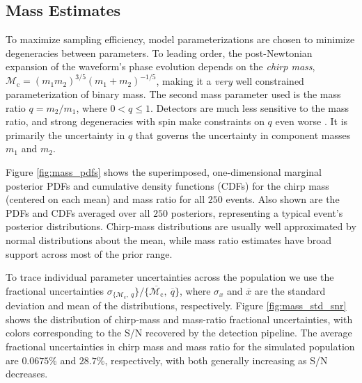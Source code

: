 \subsection{Mass Estimates}\label{sec:mass}
To maximize sampling efficiency, model parameterizations are chosen to minimize degeneracies between parameters.  To leading order, the post-Newtonian expansion of the waveform's phase evolution depends on the \emph{chirp mass}, $\mathcal{M}_\mathrm{c} = (m_1 m_2)^{3/5} (m_1 + m_2)^{-1/5}$, making it a \emph{very} well constrained parameterization of binary mass.  The second mass parameter used is the mass ratio $q = m_2/m_1$, where $0 < q \leq 1$.  Detectors are much less sensitive to the mass ratio, and strong degeneracies with spin make constraints on $q$ even worse \citep{Cutler_1994}.  It is primarily the uncertainty in $q$ that governs the uncertainty in component masses $m_1$ and $m_2$.

Figure \ref{fig:mass_pdfs} shows the superimposed, one-dimensional marginal posterior PDFs and cumulative density functions (CDFs) for the chirp mass (centered on each mean) and mass ratio for all $250$ events.  Also shown are the PDFs and CDFs averaged over all $250$ posteriors, representing a typical event's posterior distributions.  Chirp-mass distributions are usually well approximated by normal distributions about the mean, while mass ratio estimates have broad support across most of the prior range.

To trace individual parameter uncertainties across the population we use the fractional uncertainties $\sigma_{\{\mathcal{M}_\mathrm{c},~q}\}/\{\overline{\mathcal{M}_\mathrm{c}},~\overline{q}\}$, where $\sigma_x$ and $\overline{x}$ are the standard deviation and mean of the distributions, respectively.  Figure \ref{fig:mass_std_snr} shows the distribution of chirp-mass and mass-ratio fractional uncertainties, with colors corresponding to the S/N recovered by the detection pipeline. The average fractional uncertainties in chirp mass and mass ratio for the simulated population are $0.0675\%$ and $28.7\%$, respectively, with both generally increasing as S/N decreases.
  